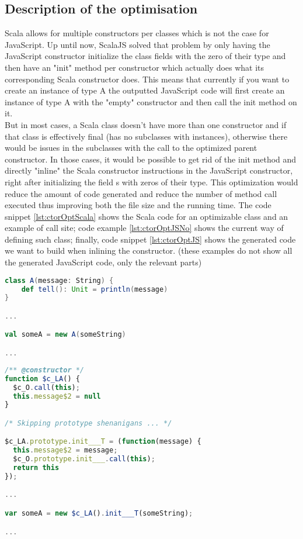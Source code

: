 \subsection{Description of the optimisation}
Scala allows for multiple constructors per classes which is not the case for JavaScript. Up until now, ScalaJS solved that problem by only having the JavaScript constructor initialize the class fields with the zero of their type and then have an "init" method per constructor which actually does what its corresponding Scala constructor does. This means that currently if you want to create an instance of type A the outputted JavaScript code will first create an instance of type A with the "empty" constructor and then call the init method on it. \\
But in most cases, a Scala class doesn't have more than one constructor and if that class is effectively final (has no subclasses with instances), otherwise there would be issues in the subclasses with the call to the optimized parent constructor. In those cases, it would be possible to get rid of the init method and directly "inline" the Scala constructor instructions in the JavaScript constructor, right after initializing the field s with zeros of their type. This optimization would reduce the amount of code generated and reduce the number of method call executed thus improving both the file size and the running time. The code snippet \ref{lst:ctorOptScala} shows the Scala code for an optimizable class and an example of call site; code example \ref{lst:ctorOptJSNo} shows the current way of defining such class; finally, code snippet \ref{lst:ctorOptJS} shows the generated code we want to build when inlining the constructor. (these examples do not show all the generated JavaScript code, only the relevant parts)
\begin{lstlisting}[language=scala,caption=Example Scala Code., label={lst:ctorOptScala}]
class A(message: String) {
    def tell(): Unit = println(message)
}

...

val someA = new A(someString)

...

\end{lstlisting}
\begin{lstlisting}[language=javascript,caption=Generated JavaScript without optimisation., label={lst:ctorOptJSNo}]
/** @constructor */
function $c_LA() {
  $c_O.call(this);
  this.message$2 = null
}

/* Skipping prototype shenanigans ... */

$c_LA.prototype.init___T = (function(message) {
  this.message$2 = message;
  $c_O.prototype.init___.call(this);
  return this
});

...

var someA = new $c_LA().init___T(someString);

...

\end{lstlisting}

